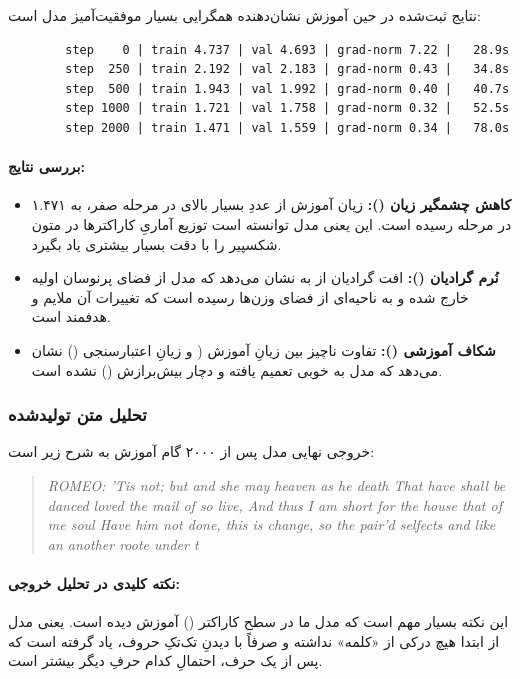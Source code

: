 \documentclass{article}
\begin{document}
نتایج ثبت‌شده در حین آموزش نشان‌دهنده همگرایی بسیار موفقیت‌آمیز مدل است:

\begin{latin}
	\begin{lstlisting}
		step    0 | train 4.737 | val 4.693 | grad-norm 7.22 |   28.9s
		step  250 | train 2.192 | val 2.183 | grad-norm 0.43 |   34.8s
		step  500 | train 1.943 | val 1.992 | grad-norm 0.40 |   40.7s
		step 1000 | train 1.721 | val 1.758 | grad-norm 0.32 |   52.5s
		step 2000 | train 1.471 | val 1.559 | grad-norm 0.34 |   78.0s
	\end{lstlisting}
\end{latin}

\paragraph{بررسی نتایج:}
\begin{itemize}
	\item \textbf{کاهش چشمگیر زیان ():} زیان آموزش از عددِ بسیار بالای در مرحله صفر، به ۱.۴۷۱ در مرحله  رسیده است. این یعنی مدل توانسته است توزیع آماریِ کاراکترها در متون شکسپیر را با دقت بسیار بیشتری یاد بگیرد.
	\item \textbf{نُرم گرادیان ():} افت گرادیان از  به نشان می‌دهد که مدل از فضای پرنوسان اولیه خارج شده و به ناحیه‌ای از فضای وزن‌ها رسیده است که تغییرات آن ملایم و هدفمند است.
	\item \textbf{شکاف آموزشی ():} تفاوت ناچیز بین زیانِ آموزش ( و زیانِ اعتبارسنجی () نشان می‌دهد که مدل به خوبی تعمیم یافته و دچار بیش‌برازش () نشده است.
\end{itemize}

\subsubsection*{تحلیل متن تولیدشده}

خروجی نهایی مدل پس از ۲۰۰۰ گام آموزش به شرح زیر است:
\begin{quote}
	\textit{ROMEO: 'Tis not; but and she may heaven as he death That have shall be danced loved the mail of so live, And thus I am short for the house that of me soul Have him not done, this is change, so the pair'd selfects and like an another roote under t}
\end{quote}

\paragraph{نکته کلیدی در تحلیل خروجی:}
این نکته بسیار مهم است که مدل ما در سطح کاراکتر () آموزش دیده است. یعنی مدل از ابتدا هیچ درکی از «کلمه» نداشته و صرفاً با دیدنِ تک‌تکِ حروف، یاد گرفته است که پس از یک حرف، احتمالِ کدام حرفِ دیگر بیشتر است.
\end{document}
